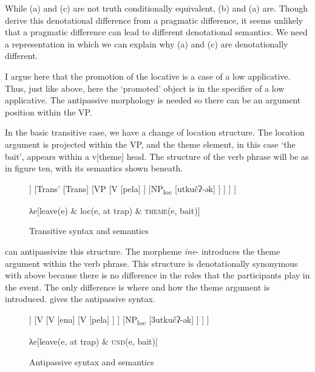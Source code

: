 \documentclass[output=paper,colorlinks,citecolor=brown,nonflat]{./langscibook}
\begin{document}
While (a) and (c) are not truth conditionally equivalent, (b) and (a) are. Though \citet{KozinskyNedjalkovPolinskaja1988} derive this denotational difference from a pragmatic difference, it seems unlikely that a pragmatic difference can lead to different denotational semantics. We need a representation in which we can explain why (a) and (c) are denotationally different.

I argue here that the promotion of the locative is a case of a low applicative. Thus, just like above, here the ‘promoted’ object is in the specifier of a low applicative. The antipassive morphology is needed so there can be an argument position within the VP.

In the basic transitive case, we have a change of location structure. The location argument is projected within the VP, and the theme element, in this case ‘the bait’, appears within a v[theme] head. The structure of the verb phrase will be as in figure ten, with its semantics shown beneath. 
\begin{figure}
	\begin{forest}
		[TransP
			[NP
				[təkečʔ-ən]
			]
			[Trans'
				[Trans]
				[VP
					[V
						[pela]
					]
					[NP\textsubscript{loc}
						[utkučʔ-ək]
					]
				]
			]
		]
	\end{forest}

λe[leave(e) \& loc(e, at trap) \& \textsc{theme}(e, bait)]
\caption{\label{fig:basilico:10}Transitive syntax and semantics}
\end{figure}
  can antipassivize this structure. The morpheme \textit{ine}{}- introduces the theme argument within the verb phrase. This structure is denotationally synonymous with  above because there is no difference in the roles that the participants play in the event. The only difference is where and how the theme argument is introduced.  gives the antipassive syntax.
\begin{figure}
	\begin{forest}
	[VP
		[NP
			[təkečʔ-a3]
		]
		[V
			[V
				[ena]
				[V
					[pela]
				]
			]
			[NP\textsubscript{loc}
				[3utkučʔ-ək]
			]
		]
	]	
	\end{forest}

	λe[leave(e, at trap) \& \textsc{und}(e, bait)]

	\caption{\label{fig:basilico:11}Antipassive syntax and semantics}
\end{figure}
               
\end{document}

